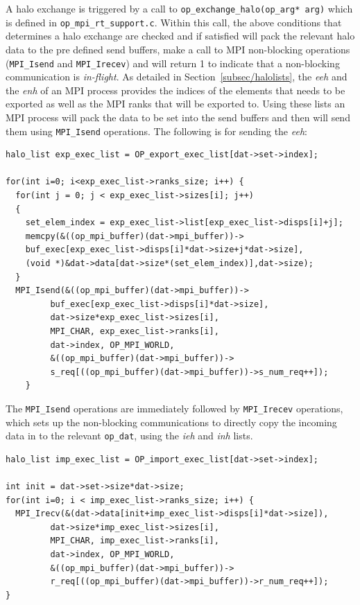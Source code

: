 \documentclass[11pt]{article}
\begin{document}
\noindent A halo exchange is triggered by a call to \texttt{op\_exchange\_halo(op\_arg* arg)} which is defined in
\texttt{op\_mpi\_rt\_support.c}. Within this call, the above conditions that determines a halo exchange are
checked and if satisfied will pack the relevant halo data to the pre defined send buffers, make a call to MPI
non-blocking operations (\texttt{MPI\_Isend} and \texttt{MPI\_Irecev}) and will return 1 to indicate that a non-blocking
communication is \textit{in-flight}. As detailed in Section~\ref{subsec/halolists}, the \textit{eeh} and the
\textit{enh} of an MPI process provides the indices of the elements that needs to be exported as well as the MPI ranks
that will be exported to. Using these lists an MPI process will pack the data to be set into the send buffers and then
will send them using \texttt{MPI\_Isend} operations. The following is for sending the \textit{eeh}:
\begin{verbatim}
halo_list exp_exec_list = OP_export_exec_list[dat->set->index];

for(int i=0; i<exp_exec_list->ranks_size; i++) {
  for(int j = 0; j < exp_exec_list->sizes[i]; j++)
  {
    set_elem_index = exp_exec_list->list[exp_exec_list->disps[i]+j];
    memcpy(&((op_mpi_buffer)(dat->mpi_buffer))->
    buf_exec[exp_exec_list->disps[i]*dat->size+j*dat->size],
    (void *)&dat->data[dat->size*(set_elem_index)],dat->size);
  }
  MPI_Isend(&((op_mpi_buffer)(dat->mpi_buffer))->
         buf_exec[exp_exec_list->disps[i]*dat->size],
         dat->size*exp_exec_list->sizes[i],
         MPI_CHAR, exp_exec_list->ranks[i],
         dat->index, OP_MPI_WORLD,
         &((op_mpi_buffer)(dat->mpi_buffer))->
         s_req[((op_mpi_buffer)(dat->mpi_buffer))->s_num_req++]);
    }
\end{verbatim}
\noindent The \texttt{MPI\_Isend} operations are immediately followed by
\texttt{MPI\_Irecev} operations, which sets up the non-blocking communications
to directly copy the incoming data in to the relevant \texttt{op\_dat}, using
the \textit{ieh} and \textit{inh} lists.
\begin{verbatim}
halo_list imp_exec_list = OP_import_exec_list[dat->set->index];

int init = dat->set->size*dat->size;
for(int i=0; i < imp_exec_list->ranks_size; i++) {
  MPI_Irecv(&(dat->data[init+imp_exec_list->disps[i]*dat->size]),
         dat->size*imp_exec_list->sizes[i],
         MPI_CHAR, imp_exec_list->ranks[i],
         dat->index, OP_MPI_WORLD,
         &((op_mpi_buffer)(dat->mpi_buffer))->
         r_req[((op_mpi_buffer)(dat->mpi_buffer))->r_num_req++]);
}
\end{verbatim}
\end{document}
